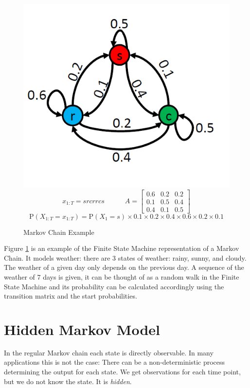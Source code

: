 \begin{figure}
    \centering
   \includegraphics{figures/markov-chain.png}
$$x_{1: T}=s r  c r r c s \quad\quad\quad A= \left[\begin{array}{lll}
0.6 & 0.2 & 0.2 \\
0.1 & 0.5 & 0.4 \\
0.4 & 0.1 & 0.5
\end{array}\right]$$
$$\mathrm{P}\left(X_{1: T}=x_{1: T}\right)=\mathrm{P}\left(X_{1}=s\right) \times 0.1 \times 0.2 \times 0.4 \times 0.6 \times 0.2 \times 0.1$$
\caption{Markov Chain Example}    
\label{fig:markov-chain-example}
\end{figure}

Figure \ref{fig:markov-chain-example} is an example of the Finite State Machine representation of a Markov Chain. It models weather: there are 3 states of weather: rainy, sunny, and cloudy. The weather of a given day only depends on the previous day. A sequence of the weather of 7 days is given, it can be thought of as a random walk in the Finite State Machine and its probability can be calculated accordingly using the transition matrix and the start probabilities. \parencite{miningmassivedatasets}

\section{Hidden Markov Model}

In the regular Markov chain each state is directly observable. In many applications this is not the case: There can be a non-deterministic process determining the output for each state. We get observations for each time point, but we do not know the state. It is \emph{hidden}. 

